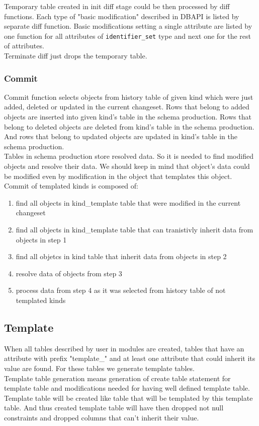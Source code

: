 \documentclass[deska]{subfiles}
\begin{document}
Temporary table created in init diff stage could be then processed by diff functions. Each type of "basic modification" described in DBAPI is listed by separate diff function. Basic modifications setting a single attribute are listed by one function for all attributes of {\tt identifier\_set} type and next one for the rest of attributes.\\

Terminate diff just drops the temporary table.

\subsubsection{Commit}
Commit function selects objects from history table of given kind which were just added, deleted or updated in the current changeset. Rows that belong to added objects are inserted into given kind's table in the schema production. Rows that belong to deleted objects are deleted from kind's table in the schema production. And rows that belong to updated objects are updated in kind's table in the schema production.\\
Tables in schema production store resolved data. So it is needed to find modified objects and resolve their data. We should keep in mind that object's data could be modified even by modification in the object that templates this object.\\
Commit of templated kinds is composed of:
\begin{enumerate}
    \item find all objects in kind\_template table that were modified in the current changeset
    \item find all objects in kind\_template table that can tranistivly inherit data from objects in step 1
    \item find all objetcs in kind table that inherit data from objects in step 2
    \item resolve data of objects from step 3
    \item process data from step 4 as it was selected from history table of not templated kinds
\end{enumerate}


\subsection{Template}
When all tables described by user in modules are created, tables that have an attribute with prefix "template\_" and at least one attribute that could inherit its value are found. For these tables we generate template tables.\\
Template table generation means generation of create table statement for template table and modifications needed for having well defined template table.
Template table will be created like table that will be templated by this template table. And thus created template table will have then dropped not null constraints and dropped columns that can't inherit their value.
\end{document}
